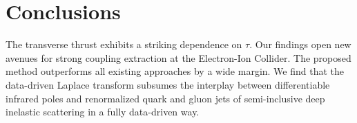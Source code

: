 \section{Conclusions}\label{sec:conclusions}

The transverse thrust exhibits a striking dependence on $\tau$. Our
findings open new avenues for strong coupling extraction at the
Electron-Ion Collider. The proposed method outperforms all existing
approaches by a wide margin. We find that the data-driven Laplace
transform subsumes the interplay between differentiable infrared poles
and renormalized quark and gluon jets of semi-inclusive deep inelastic
scattering in a fully data-driven way.

